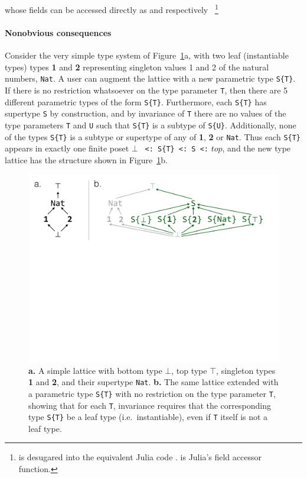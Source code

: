 \documentclass[pldi]{sigplanconf-pldi15}
\begin{document}
whose fields can be accessed directly as  and  respectively~
\footnote{ is desugared into the equivalent Julia code .
 is Julia's field accessor function.}


\paragraph{Nonobvious consequences}

Consider the very simple type system of Figure~\ref{fig:lattice}a, with two
leaf (instantiable types) types \textbf{1} and \textbf{2} representing
singleton values 1 and 2 of the natural numbers, \verb|Nat|. A user can
augment the lattice with a new parametric type \verb|S{T}|. If there is no
restriction whatsoever on the type parameter \verb|T|, then there are 5
different parametric types of the form \verb|S{T}|. Furthermore, each
\verb|S{T}| has supertype \verb|S| by construction, and by invariance of
\verb|T| there are no values of the type parameters \verb|T| and \verb|U| such
that \verb|S{T}| is a subtype of \verb|S{U}|. Additionally, none of the types
\verb|S{T}| is a subtype or supertype of any of \textbf{1}, \textbf{2} or
\verb|Nat|.  Thus each \verb|S{T}| appears in exactly one finite poset $\bot$
\verb| <: S{T} <: S <:| $top$, and the new type lattice has the structure shown
in Figure~\ref{fig:lattice}b.

\begin{figure}
	\centering
	\includegraphics[width=\columnwidth]{fig-lattice}
	\caption{
		\textbf{a.} A simple lattice with bottom type $\bot$, top type
		$\top$, singleton types \textbf{1} and \textbf{2}, and their
		supertype \texttt{Nat}.
		\textbf{b.} The same lattice extended with a parametric type
		\texttt{S\{T\}} with no restriction on the type parameter
		\texttt{T}, showing that for each \texttt{T}, invariance
		requires that the corresponding type \texttt{S\{T\}} be a leaf
		type (i.e.\ instantiable), even if \texttt{T} itself is not a
		leaf type.}
	\label{fig:lattice}
\end{figure}
\end{document}
